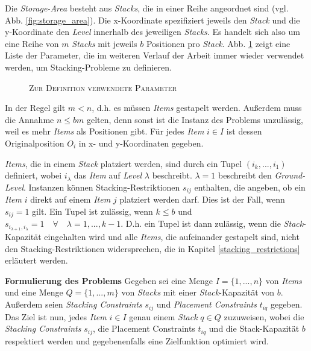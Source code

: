 Die \textit{Storage-Area} besteht aus \textit{Stacks}, die in einer Reihe angeordnet sind (vgl. Abb. \ref{fig:storage_area}). Die x-Koordinate spezifiziert jeweils den \textit{Stack} und die y-Koordinate den \textit{Level} innerhalb des jeweiligen \textit{Stacks}. Es handelt sich also um eine Reihe von $m$ \textit{Stacks} mit jeweils $b$ Positionen pro \textit{Stack}. Abb. \ref{fig:parameters} zeigt eine Liste der
Parameter, die im weiteren Verlauf der Arbeit immer wieder verwendet werden, um Stacking-Probleme zu definieren.
\begin{figure}[H]
\centering
{}
\caption{\textsc{Zur Definition verwendete Parameter}}
\label{fig:parameters}
\end{figure}
In der Regel gilt $m < n$, d.h. es müssen \textit{Items} gestapelt werden.
Außerdem muss die Annahme $n \leq bm$ gelten, denn sonst ist die Instanz des Problems unzulässig,
weil es mehr \textit{Items} als Positionen gibt.\newline
Für jedes \textit{Item} $i \in I$ ist dessen Originalposition $O_i$ in x- und y-Koordinaten gegeben.

\textit{Items}, die in einem \textit{Stack} platziert werden, sind durch ein Tupel $(i_k, ..., i_1)$ definiert, wobei
$i_\lambda$ das \textit{Item} auf \textit{Level} $\lambda$ beschreibt. $\lambda = 1$ beschreibt den \textit{Ground-Level}.
Instanzen können Stacking-Restriktionen $s_{ij}$ enthalten, die angeben, ob ein \textit{Item} $i$ direkt auf einem \textit{Item} $j$ platziert
werden darf. Dies ist der Fall, wenn $s_{ij} = 1$ gilt.
Ein Tupel ist zulässig, wenn $k \leq b$ und $s_{i_{\lambda + 1}, i_\lambda} = 1 \quad \forall \quad \lambda = 1, ..., k - 1$.
D.h. ein Tupel ist dann zulässig, wenn die \textit{Stack}-Kapazität eingehalten wird und alle \textit{Items}, die aufeinander gestapelt sind,
nicht den Stacking-Restriktionen widersprechen, die in Kapitel \ref{stacking_restrictions} erläutert werden.

\textbf{Formulierung des Problems}\newline
Gegeben sei eine Menge $I = \{1, ..., n\}$ von \textit{Items} und eine Menge $Q = \{1, ..., m\}$ von \textit{Stacks} mit einer \textit{Stack}-Kapazität von $b$. Außerdem seien \textit{Stacking Constraints} $s_{ij}$ und \textit{Placement Constraints} $t_{iq}$ gegeben.
Das Ziel ist nun, jedes \textit{Item} $i \in I$ genau einem \textit{Stack} $q \in Q$ zuzuweisen, wobei die \textit{Stacking Constraints} $s_{ij}$,
die Placement Constraints $t_{iq}$ und die Stack-Kapazität $b$ respektiert werden und gegebenenfalls eine Zielfunktion optimiert wird.

